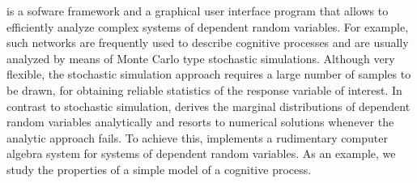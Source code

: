  is a sofware framework and a graphical user interface program that allows to efficiently 
analyze complex systems of dependent random variables. For example, such networks are 
frequently used to describe cognitive processes and are usually analyzed by means of Monte Carlo
type stochastic simulations. Although very flexible, the stochastic simulation approach requires a
large number of samples to be drawn, for obtaining reliable statistics of the response variable of
interest. In contrast to stochastic simulation,  derives the marginal distributions of
dependent random variables analytically and resorts to numerical solutions whenever the analytic
approach fails. To achieve this,   implements a rudimentary computer algebra system
for systems of dependent random variables. As an example, we study the properties of a simple 
model of a cognitive process.

